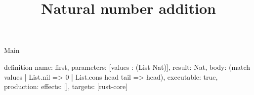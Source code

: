 \begin{lexlean}{Main}
\title{Natural number addition}
\begin{semanticmodule}
definition{
  name: first,
  parameters: [values : (List Nat)],
  result: Nat,
  body: (match values | List.nil => 0 | List.cons head tail => head),
  executable: true,
  production: {effects: [], targets: [rust-core]}
}
\end{semanticmodule}
\end{lexlean}
